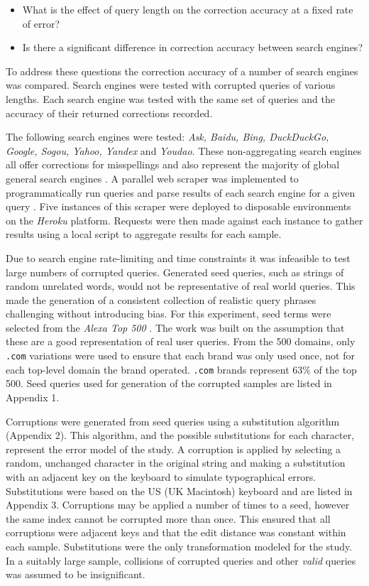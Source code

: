 \documentclass{csfourzero}
\begin{document}
\begin{itemize}
  \item{What is the effect of query length on the correction accuracy at a fixed rate of error?}
  \item{Is there a significant difference in correction accuracy between search engines?}
\end{itemize}

\noindent
To address these questions the correction accuracy of a number of search engines was compared. Search engines were tested with corrupted queries of various lengths. Each search engine was tested with the same set of queries and the accuracy of their returned corrections recorded.

The following search engines were tested: \textit{Ask, Baidu, Bing, DuckDuckGo, Google, Sogou, Yahoo, Yandex} and \textit{Youdao}. These non-aggregating search engines all offer corrections for misspellings and also represent the majority of global general search engines \cite{searchenginewiki}. A parallel web scraper was implemented to programmatically run queries and parse results of each search engine for a given query \cite{scraper}. Five instances of this scraper were deployed to disposable environments on the \textit{Heroku} platform. Requests were then made against each instance to gather results using a local script to aggregate results for each sample.

Due to search engine rate-limiting and time constraints it was infeasible to test large numbers of corrupted queries. Generated seed queries, such as strings of random unrelated words, would not be representative of real world queries. This made the generation of a consistent collection of realistic query phrases challenging without introducing bias. For this experiment, seed terms were selected from the \textit{Alexa Top 500} \cite{alexatop500}. The work was built on the assumption that these are a good representation of real user queries. From the 500 domains, only \texttt{.com} variations were used to ensure that each brand was only used once, not for each top-level domain the brand operated. \texttt{.com} brands represent 63\% of the top 500. Seed queries used for generation of the corrupted samples are listed in Appendix 1.

Corruptions were generated from seed queries using a substitution algorithm (Appendix 2). This algorithm, and the possible substitutions for each character, represent the error model of the study. A corruption is applied by selecting a random, unchanged character in the original string and making a substitution with an adjacent key on the keyboard to simulate typographical errors. Substitutions were based on the US (UK Macintosh) keyboard and are listed in Appendix 3. Corruptions may be applied a number of times to a seed, however the same index cannot be corrupted more than once. This ensured that all corruptions were adjacent keys and that the edit distance was constant within each sample. Substitutions were the only transformation modeled for the study. In a suitably large sample, collisions of corrupted queries and other \textit{valid} queries was assumed to be insignificant.
\end{document}
